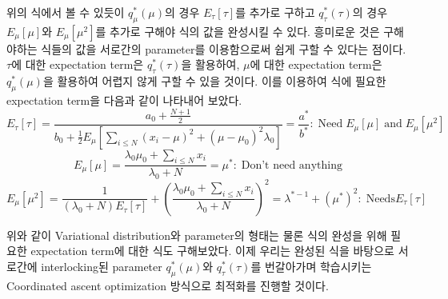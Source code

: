 \documentclass[draft=false]{oblivoir}
\begin{document}
위의 식에서 볼 수 있듯이 $q_{\mu}^*(\mu)$의 경우 $E_{\tau}[\tau]$를 추가로 구하고 $q_{\tau}^{*}(\tau)$의 경우 $E_{\mu}[\mu]$와 $E_{\mu}[\mu^2]$를 추가로 구해야 식의 값을 완성시킬 수 있다. 흥미로운 것은 구해야하는 식들의 값을 서로간의 parameter를 이용함으로써 쉽게 구할 수 있다는 점이다. $\tau$에 대한 expectation term은 $q_{\tau}^{*}(\tau)$을 활용하여, $\mu$에 대한 expectation term은 $q_{\mu}^*(\mu)$을 활용하여 어렵지 않게 구할 수 있을 것이다. 이를 이용하여 식에 필요한 expectation term을 다음과 같이 나타내어 보았다. 
\begin{equation}
E_{\tau}[\tau]=\frac{a_{0}+\frac{N+1}{2}}{b_{0}+\frac{1}{2}E_{\mu}\left[\sum_{i \leq N}(x_{i}-\mu)^2+(\mu-\mu_{0})^2\lambda_{0}\right]}=\frac{a^*}{b^*}:\;\text{Need} \; E_{\mu}[\mu] \; \text{and} \; E_{\mu}[\mu^2]
\label{eq:11-2-11-6}
\end{equation}
\begin{equation}
E_{\mu}[\mu]=\frac{\lambda_{0}\mu_{0}+\sum_{i \leq N}x_{i}}{\lambda_{0}+N}=\mu^*:\;\text{Don't need anything}
\label{eq:11-2-11-7}
\end{equation}
\begin{equation}
E_{\mu}[\mu^2]=\frac{1}{(\lambda_{0}+N)E_{\tau}[\tau]}+(\frac{\lambda_{0}\mu_{0}+\sum_{i \leq N}x_{i}}{\lambda_{0}+N})^2=\lambda^{*-1}+(\mu^*)^2: \;\text{Needs} E_{\tau}[\tau]
\label{eq:11-2-11-8}
\end{equation}

위와 같이 Variational distribution와 parameter의 형태는 물론 식의 완성을 위해 필요한 expectation term에 대한 식도 구해보았다. 이제 우리는 완성된 식을 바탕으로 서로간에 interlocking된 parameter $q_{\mu}^*(\mu)$와 $q_{\tau}^{*}(\tau)$를 번갈아가며 학습시키는 Coordinated ascent optimization 방식으로 최적화를 진행할 것이다. 
\end{document}
